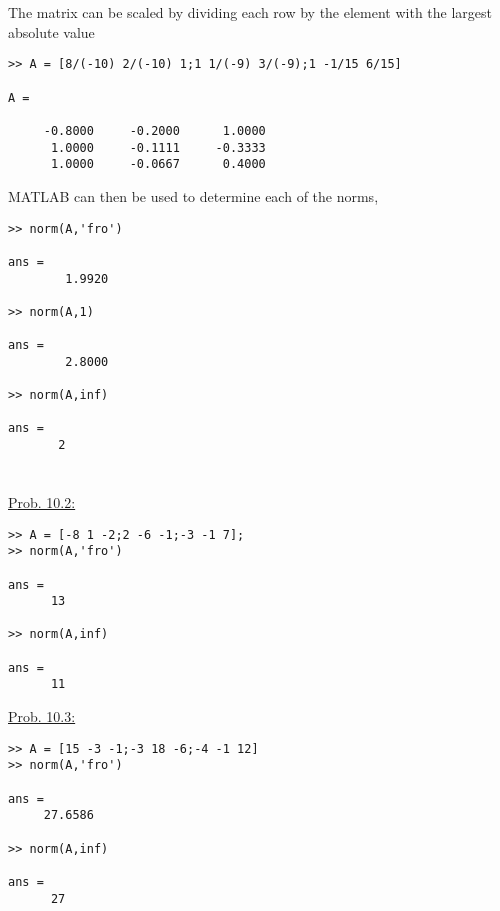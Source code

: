 \documentclass[../main.tex]{subfiles}
\begin{document}
\begin{enumerate}[label=\bfseries(\alph*)]
\section{}
The matrix can be scaled by dividing each row by the element with the largest absolute value
\bigbreak
\begin{lstlisting}[numbers=none]
>> A = [8/(-10) 2/(-10) 1;1 1/(-9) 3/(-9);1 -1/15 6/15]

A =

	 -0.8000	 -0.2000	  1.0000
	  1.0000	 -0.1111	 -0.3333
	  1.0000	 -0.0667	  0.4000
\end{lstlisting}
\bigbreak
MATLAB can then be used to determine each of the norms,
\bigbreak
\begin{lstlisting}[numbers=none]
>> norm(A,'fro')

ans =
 		1.9920
 
>> norm(A,1)

ans =
 		2.8000
 
>> norm(A,inf)

ans =
	   2 
\end{lstlisting}
\bigbreak


\section{}
\underline{Prob. 10.2:}
\bigbreak
\begin{lstlisting}[numbers=none]
>> A = [-8 1 -2;2 -6 -1;-3 -1 7];
>> norm(A,'fro')

ans =
 	  13
 
>> norm(A,inf)

ans =
 	  11
\end{lstlisting}
\bigbreak
\underline{Prob. 10.3:}
\bigbreak
\begin{lstlisting}[numbers=none]
>> A = [15 -3 -1;-3 18 -6;-4 -1 12]
>> norm(A,'fro')

ans =
 	 27.6586
 
>> norm(A,inf)

ans =
 	  27


\end{lstlisting}
\bigbreak
\end{enumerate}
\end{document}
